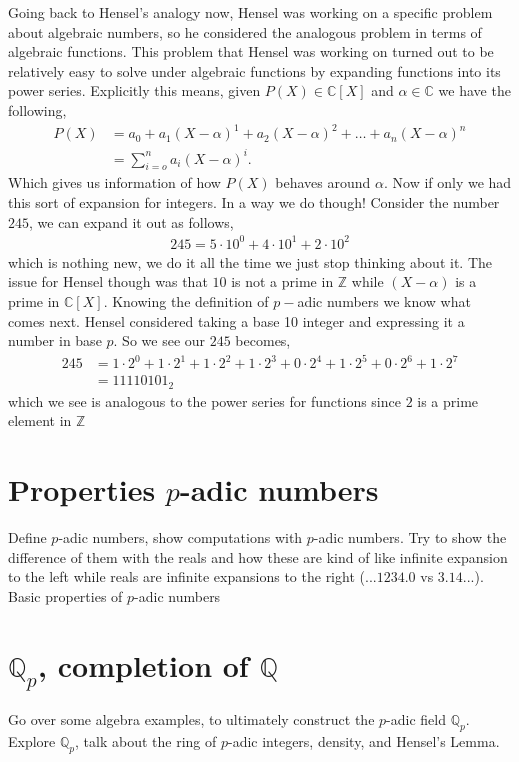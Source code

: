 \documentclass[12pt]{article}
\newcommand{\zz}{\mathbb Z}   %
\newcommand{\qq}{\mathbb Q}   %
\newcommand{\cc}{\mathbb C}   %
\begin{document}
Going back to Hensel's analogy now, Hensel was working on a specific problem about algebraic numbers, so he considered the analogous problem in terms of algebraic functions. This problem that Hensel was working on turned out to be relatively easy to solve under algebraic functions by expanding functions into its power series. Explicitly this means, given $P(X) \in \cc[X]$ and $\alpha \in \cc$ we have the following,
\begin{align*}
  P(X) &= a_0 + a_1(X -\alpha)^{1} + a_2(X-\alpha)^{2} + \dots + a_n(X-\alpha)^{n} \\
  &= \sum_{i = o}^{n}a_i(X-\alpha)^{i}.
\end{align*}
Which gives us information of how $P(X)$ behaves around $\alpha$. Now if only we had this sort of expansion for integers. In a way we do though! Consider the number $245$, we can expand it out as follows,
\begin{align*}
  245 = 5\cdot 10^{0} + 4\cdot 10^{1} + 2 \cdot 10^{2}
\end{align*}
which is nothing new, we do it all the time we just stop thinking about it. The issue for Hensel though was that $10$ is not a prime in $\zz$ while $(X-\alpha)$ is a prime in $\cc[X]$. Knowing the definition of $p-$adic numbers we know what comes next. Hensel considered taking a base 10 integer and expressing it a number in base $p$. So we see our $245$ becomes,
\begin{align*}
  245 &= 1 \cdot 2^{0} + 1\cdot 2^{1} + 1 \cdot 2^{2} + 1\cdot 2^{3} + 0\cdot 2^{4} + 1 \cdot 2^{5} + 0 \cdot 2^{6} + 1\cdot 2^{7} \\
  &= 11110101_2
\end{align*}
which we see is analogous to the power series for functions since $2$ is a prime element in $\zz$

\section{Properties $p$-adic numbers}
Define $p$-adic numbers, show computations with $p$-adic numbers. Try to show the difference of them with the reals and how these are kind of like infinite expansion to the left while reals are infinite expansions to the right ($...1234.0 $ vs $3.14...$). Basic properties of $p$-adic numbers

\section{$\qq_p$, completion of $\qq$ }
Go over some algebra examples, to ultimately construct the $p$-adic field $\qq_p$. Explore $\qq_p$, talk about the ring of $p$-adic integers, density, and Hensel's Lemma. 
\end{document}
